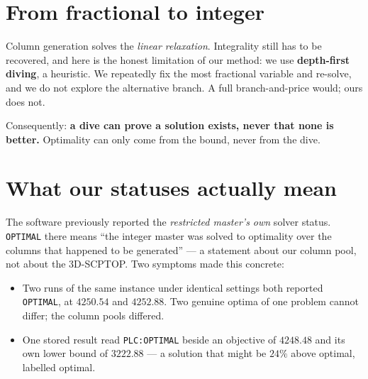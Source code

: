\documentclass[11pt,a4paper]{article}
\begin{document}
\section{From fractional to integer}

Column generation solves the \emph{linear relaxation}. Integrality still has to
be recovered, and here is the honest limitation of our method: we use
\textbf{depth-first diving}, a heuristic. We repeatedly fix the most fractional
variable and re-solve, and we do not explore the alternative branch. A full
branch-and-price would; ours does not.

\begin{center}
\end{center}

Consequently: \textbf{a dive can prove a solution exists, never that none is
better.} Optimality can only come from the bound, never from the dive.

\section{What our statuses actually mean}

The software previously reported the \emph{restricted master's own} solver
status. \texttt{OPTIMAL} there means ``the integer master was solved to
optimality over the columns that happened to be generated'' --- a statement
about our column pool, not about the 3D-SCPTOP. Two symptoms made this concrete:

\begin{itemize}
\item Two runs of the same instance under identical settings both reported
      \texttt{OPTIMAL}, at $4250.54$ and $4252.88$. Two genuine optima of one
      problem cannot differ; the column pools differed.
\item One stored result read \texttt{PLC:OPTIMAL} beside an objective of
      $4248.48$ and its own lower bound of $3222.88$ --- a solution that might
      be $24\%$ above optimal, labelled optimal.
\end{itemize}
\end{document}
